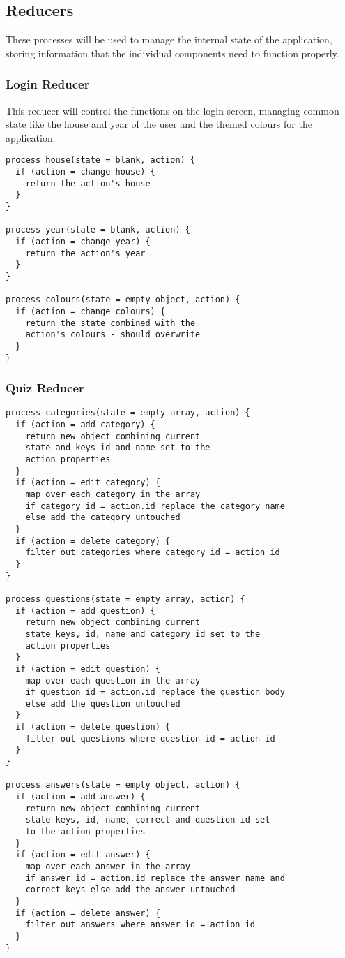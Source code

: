 \subsection{Reducers}
These processes will be used to manage the internal state of the application, storing information that the individual components need to function properly.

\subsubsection{Login Reducer}
This reducer will control the functions on the login screen, managing common state like the house and year of the user and the themed colours for the application.
\begin{verbatim}
process house(state = blank, action) {
  if (action = change house) {
    return the action's house
  }
}

process year(state = blank, action) {
  if (action = change year) {
    return the action's year
  }
}

process colours(state = empty object, action) {
  if (action = change colours) {
    return the state combined with the
    action's colours - should overwrite
  }
}
\end{verbatim}

\subsubsection{Quiz Reducer}
\begin{verbatim}
process categories(state = empty array, action) {
  if (action = add category) {
    return new object combining current
    state and keys id and name set to the
    action properties
  }
  if (action = edit category) {
    map over each category in the array
    if category id = action.id replace the category name
    else add the category untouched
  }
  if (action = delete category) {
    filter out categories where category id = action id
  }
}

process questions(state = empty array, action) {
  if (action = add question) {
    return new object combining current
    state keys, id, name and category id set to the
    action properties
  }
  if (action = edit question) {
    map over each question in the array
    if question id = action.id replace the question body
    else add the question untouched
  }
  if (action = delete question) {
    filter out questions where question id = action id
  }
}

process answers(state = empty object, action) {
  if (action = add answer) {
    return new object combining current
    state keys, id, name, correct and question id set
    to the action properties
  }
  if (action = edit answer) {
    map over each answer in the array
    if answer id = action.id replace the answer name and
    correct keys else add the answer untouched
  }
  if (action = delete answer) {
    filter out answers where answer id = action id
  }
}
\end{verbatim}
